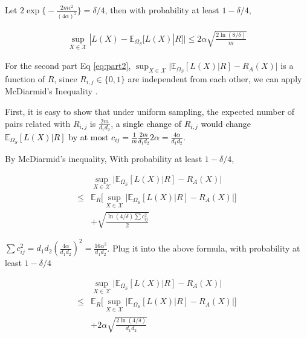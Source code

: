 \documentclass{article}
\numberwithin{equation}{section}
\newcommand{\laks}[1]{\textcolor{black}{#1}}
\newcommand{\supX}{\sup_{X \in \mathcal{X}}}
\newcommand{\E}{\mathbb{E}}
\newtheorem{sampling strategy}{Sampling Strategy}
\begin{document}
Let $2 \exp\Big\{-\frac{2m \epsilon^2}{(4\alpha)^2} \Big\} = \delta/4$, then with probability at least $1 - \delta/4$,

\begin{equation}
    \begin{aligned}
        \supX |L(X) - \mathbb{E}_{\Omega_S} [L(X) | R] | \leq 2 \alpha \sqrt{\frac{2\ln(8/\delta)}{m}}
        \label{eq:res_part1}
    \end{aligned}
\end{equation}

For the second part Eq \ref{eq:part2}, $\supX \big|\mathbb{E}_{\Omega_S} [L(X) | R] - R_A(X) \big|$ is a function of $R$, since $R_{i,j} \in \{0, 1\}$ are independent from each other, we can apply McDiarmid's Inequality \cite{Mc}.

First, it is easy to show that under uniform sampling, the expected number of pairs related with $R_{i,j}$ is $\frac{2m}{d_1 d_2}$, \laks{a single change of $R_{i,j}$ would  change $\E_{\Omega_S}[L(X)|R] $ by at most $c_{ij} = \frac{1}{m} \frac{2m}{d_1 d_2} 2\alpha = \frac{4 \alpha }{d_1 d_2} $.} 

By McDiarmid's inequality, With probability at least $1 - \delta/4$,

\begin{equation}
    \begin{aligned}
    & \sup_{X \in \mathcal{X}} \big| \mathbb{E}_{\Omega_S} [L(X) | R] - R_A(X) \big| \\
    \leq & \mathbb{E}_R \Big[ \sup_{X \in \mathcal{X}} \big|\mathbb{E}_{\Omega_S} [L(X) | R] - R_A(X) \big| \Big] \\
    & + \sqrt{ \frac{\ln(4/\delta) \sum c_{ij}^2 }{2} } \nonumber
    \end{aligned}
\end{equation}

$\sum c_{ij}^2 = d_1 d_2 (\frac{4\alpha}{d_1 d_2})^2 = \frac{16 \alpha^2}{d_1 d_2}$. Plug it into the above formula, with probability at least $1 - \delta/4$

\begin{equation}
    \begin{aligned}
    & \sup_{X \in \mathcal{X}} \big| \mathbb{E}_{\Omega_S} [L(X) | R] - R_A(X) \big| \\
    \leq & \mathbb{E}_R \Big[ \sup_{X \in \mathcal{X}} \big|\mathbb{E}_{\Omega_S} [L(X) | R] - R_A(X) \big| \Big] \\
    & + 2\alpha \sqrt{ \frac{2\ln(4/\delta) }{d_1 d_2} }  \label{eq:res_part2}
    \end{aligned}
\end{equation}
\end{document}
